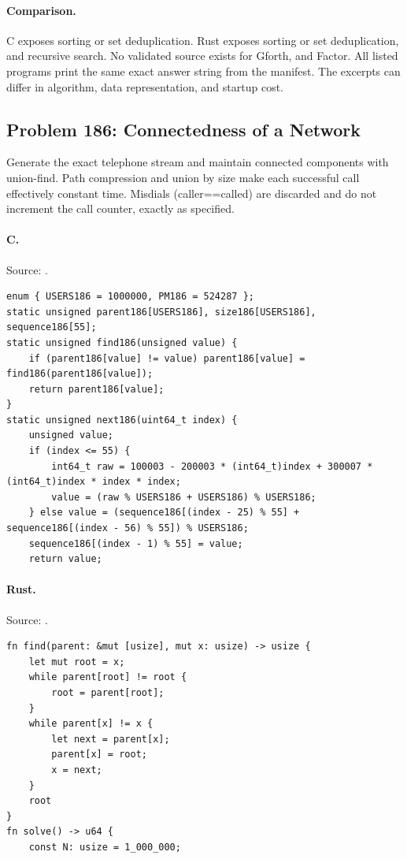 \paragraph{Comparison.}
C exposes sorting or set deduplication. Rust exposes sorting or set deduplication, and recursive search.
No validated source exists for Gforth, and Factor.
All listed programs print the same exact answer string from the manifest. The excerpts can differ in algorithm, data representation, and startup cost.

\subsection{Problem 186: Connectedness of a Network}
\label{walkthrough:p186}
Generate the exact telephone stream and maintain connected components with union-find. Path compression and union by size make each successful call effectively constant time. Misdials (caller==called) are discarded and do not increment the call counter, exactly as specified.

\paragraph{C.} Source: .
\begin{lstlisting}
enum { USERS186 = 1000000, PM186 = 524287 };
static unsigned parent186[USERS186], size186[USERS186], sequence186[55];
static unsigned find186(unsigned value) {
    if (parent186[value] != value) parent186[value] = find186(parent186[value]);
    return parent186[value];
}
static unsigned next186(uint64_t index) {
    unsigned value;
    if (index <= 55) {
        int64_t raw = 100003 - 200003 * (int64_t)index + 300007 * (int64_t)index * index * index;
        value = (raw % USERS186 + USERS186) % USERS186;
    } else value = (sequence186[(index - 25) % 55] + sequence186[(index - 56) % 55]) % USERS186;
    sequence186[(index - 1) % 55] = value;
    return value;
\end{lstlisting}

\paragraph{Rust.} Source: .
\begin{lstlisting}
fn find(parent: &mut [usize], mut x: usize) -> usize {
    let mut root = x;
    while parent[root] != root {
        root = parent[root];
    }
    while parent[x] != x {
        let next = parent[x];
        parent[x] = root;
        x = next;
    }
    root
}
fn solve() -> u64 {
    const N: usize = 1_000_000;
\end{lstlisting}

